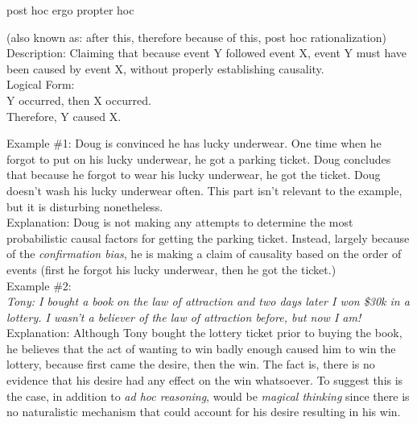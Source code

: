 \documentclass[a4paper,12pt,single,pdftex]{scrartcl}
\begin{document}
post hoc ergo propter hoc
    
      (also known as: after this, therefore because of this, post hoc rationalization)
    \\

  
    
      Description: Claiming that because event Y followed event X, event Y must have been caused by event X, without properly establishing causality.
    \\

    
      Logical Form:
    \\

    
      Y occurred, then X occurred.
    \\

    
      Therefore, Y caused X.
    \\

    
       \newline

      

      
        Example \#1: Doug is convinced he has lucky underwear. One time when he forgot to put on his lucky underwear, he got a parking ticket. Doug concludes that because he forgot to wear his lucky underwear, he got the ticket. Doug doesn't wash his lucky underwear often. This part isn't relevant to the example, but it is disturbing nonetheless.
      \\

      
        Explanation: Doug is not making any attempts to determine the most probabilistic causal factors for getting the parking ticket. Instead, largely because of the {\em confirmation bias}, he is making a claim of causality based on the order of events (first he forgot his lucky underwear, then he got the ticket.)
      \\

      
        Example \#2: 
      \\

      
        {\em Tony: I bought a book on the law of attraction and two days later I won \$30k in a lottery. I wasn’t a believer of the law of attraction before, but now I am!}
      \\

      
        Explanation: Although Tony bought the lottery ticket prior to buying the book, he believes that the act of wanting to win badly enough caused him to win the lottery, because first came the desire, then the win. The fact is, there is no evidence that his desire had any effect on the win whatsoever. To suggest this is the case, in addition to {\em ad hoc reasoning}, would be {\em magical thinking}  since there is no naturalistic mechanism that could account for his desire resulting in his win.
      \\
\end{document}
